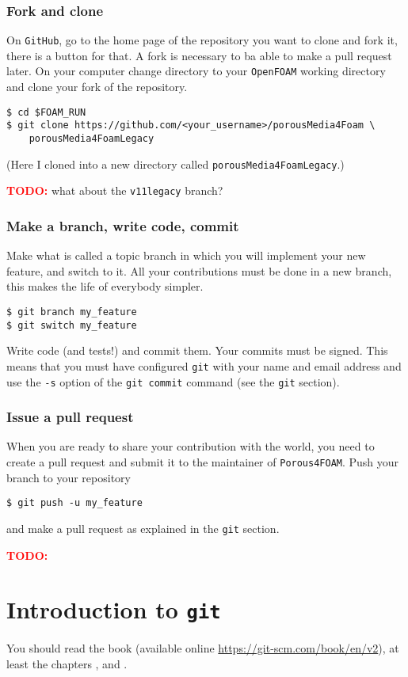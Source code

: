 \documentclass[a4paper]{article}
\newcommand{\OF}{\texttt{OpenFOAM}\xspace}
\newcommand{\PF}{\texttt{Porous4FOAM}\xspace}
\newcommand{\GIT}{\texttt{git}\xspace}
\newcommand{\GH}{\texttt{GitHub}\xspace}
\newcommand{\TODO}{\textcolor{red}{\textsf{\textbf{TODO:}}}\xspace}
\begin{document}
\subsubsection{Fork and clone}
On \GH, go to the home page of the repository you want to clone and fork it,
there is a button for that. A fork is necessary to ba able to make a pull
request later. On your computer change directory to your \OF
working directory and clone your fork of the repository.
\begin{verbatim}
$ cd $FOAM_RUN
$ git clone https://github.com/<your_username>/porousMedia4Foam \
    porousMedia4FoamLegacy
\end{verbatim}
(Here I cloned into a new directory called \texttt{porousMedia4FoamLegacy}.)

\TODO what about the \texttt{v11legacy} branch?

\subsubsection{Make a branch, write code, commit}
Make what is called a topic branch in which you will implement your new feature, 
and switch to it. All your contributions must be done in a new branch, this
makes the life of everybody simpler.
\begin{verbatim}
$ git branch my_feature
$ git switch my_feature
\end{verbatim}
Write code (and tests!) and commit them. Your commits must be signed. This means
that you must have configured \GIT with your name and email address and use the
\texttt{-s} option of the \texttt{git commit} command (see the \GIT
section). 

\subsubsection{Issue a pull request}
When you are ready to share your contribution with the world, you need to create
a pull request and submit it to the maintainer of \PF.
Push your branch to your repository
\begin{verbatim}
$ git push -u my_feature
\end{verbatim}
and make a pull request as explained in the \GIT section.

\TODO



\section{Introduction to \GIT}
You should read the book 
(available online \url{https://git-scm.com/book/en/v2}), at least the chapters
\textquote{Getting started},  and \textquote{Git
basics}.
\end{document}

